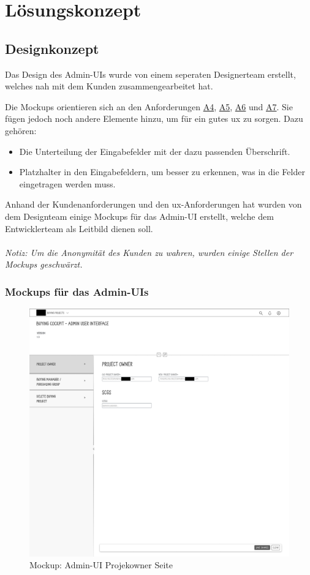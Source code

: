 \newpage
\section{Lösungskonzept}
\subsection[Designkonzept]{Designkonzept}
Das Design des Admin-UIs wurde von einem seperaten Designerteam erstellt, welches nah mit dem Kunden zusammengearbeitet hat.

Die Mockups orientieren sich an den Anforderungen \hyperref[Tab:A4]{A4}, \hyperref[Tab:A5]{A5}, \hyperref[Tab:A6]{A6} und \hyperref[Tab:A7]{A7}. Sie fügen jedoch noch andere Elemente hinzu, um für ein gutes \gls{ux} zu sorgen. Dazu gehören:
\begin{itemize}
    \item Die Unterteilung der Eingabefelder mit der dazu passenden Überschrift.
    \item Platzhalter in den Eingabefeldern, um besser zu erkennen, was in die Felder eingetragen werden muss.
\end{itemize}

Anhand der Kundenanforderungen und den \gls{ux}-Anforderungen hat wurden von dem Designteam einige Mockups für das Admin-UI erstellt, welche dem Entwicklerteam als Leitbild dienen soll. \\\\
\textit{Notiz: Um die Anonymität des Kunden zu wahren, wurden einige Stellen der Mockups geschwärzt.}

\subsubsection[short]{Mockups für das Admin-UIs}
\begin{figure}[H]
    \centering
    \includegraphics[width=\linewidth]{Images/Mockup_PO_anonym.png}
    \caption[Mockup: Admin-UI Projekowner Seite]{Mockup: Admin-UI Projekowner Seite}
\end{figure}

